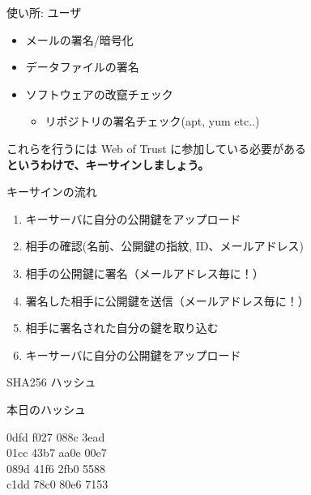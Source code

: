 \begin{frame}{使い所: ユーザ}
\begin{itemize}
  \item メールの署名/暗号化
  \item データファイルの署名
  \item ソフトウェアの改竄チェック
  \begin{itemize}
    \item リポジトリの署名チェック(apt, yum etc..)
  \end{itemize}
\end{itemize}
\end{frame}


\begin{frame}
  \begin{center}

これらを行うには Web of Trust に参加している必要がある \\ \pause
\Huge\bfseries 
というわけで、キーサインしましょう。
  \end{center}
\end{frame}


\begin{frame}{キーサインの流れ}
\begin{enumerate}
  \item キーサーバに自分の公開鍵をアップロード
  \item 相手の確認(名前、公開鍵の指紋, ID、メールアドレス)
  \item 相手の公開鍵に署名（メールアドレス毎に！）
  \item 署名した相手に公開鍵を送信（メールアドレス毎に！）
  \item 相手に署名された自分の鍵を取り込む
  \item キーサーバに自分の公開鍵をアップロード
\end{enumerate}
\end{frame}

\begin{frame}{SHA256 ハッシュ}
\begin{center}
本日のハッシュ\\
\Huge

0dfd f027 088c 3ead \\
01cc 43b7 aa0e 00e7 \\
089d 41f6 2fb0 5588 \\
c1dd 78c0 80e6 7153 \\



\end{center}
\end{frame}


